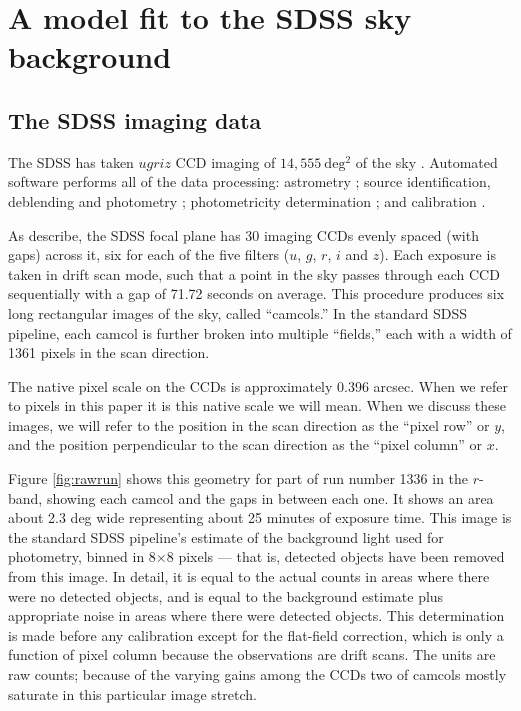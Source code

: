 \documentclass[10pt,preprint]{aastex}
\begin{document}
\section{A model fit to the SDSS sky background}
\label{sec:model}

\subsection{The SDSS imaging data}
\label{sec:data}

The SDSS has taken $ugriz$ CCD imaging of $14,555~\mathrm{deg^2}$ of
the sky \citep{york00a,aihara11a}.  Automated software performs all of
the data processing: astrometry \citep{pier03a}; source
identification, deblending and photometry \citep{lupton01a};
photometricity determination \citep{hogg01a}; and calibration
\citep{fukugita96a,smith02a, padmanabhan07b}.

As \citet{gunn05a} describe, the SDSS focal plane has 30 imaging CCDs
evenly spaced (with gaps) across it, six for each of the five filters
($u$, $g$, $r$, $i$ and $z$). Each exposure is taken in drift scan
mode, such that a point in the sky passes through each CCD
sequentially with a gap of 71.72 seconds on average.  This procedure
produces six long rectangular images of the sky, called ``camcols.''
In the standard SDSS pipeline, each camcol is further broken into
multiple ``fields,'' each with a width of 1361 pixels in the scan
direction.

The native pixel scale on the CCDs is approximately 0.396 arcsec. When
we refer to pixels in this paper it is this native scale we will
mean. When we discuss these images, we will refer to the position in
the scan direction as the ``pixel row'' or $y$, and the position
perpendicular to the scan direction as the ``pixel column'' or $x$.

Figure \ref{fig:rawrun} shows this geometry for part of run number
1336 in the $r$-band, showing each camcol and the gaps in between each
one.  It shows an area about 2.3 deg wide representing about 25
minutes of exposure time.  This image is the standard SDSS pipeline's
estimate of the background light used for photometry, binned in
8$\times$8 pixels --- that is, detected objects have been removed from
this image.  In detail, it is equal to the actual counts in areas
where there were no detected objects, and is equal to the background
estimate plus appropriate noise in areas where there were detected
objects. This determination is made before any calibration except for
the flat-field correction, which is only a function of pixel column
because the observations are drift scans.  The units are raw counts;
because of the varying gains among the CCDs two of camcols mostly
saturate in this particular image stretch.
\end{document}
